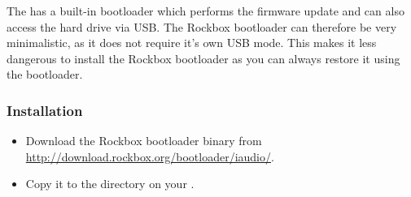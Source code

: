 The \archosplayername{} has a built-in bootloader which performs the
firmware update and can also access the hard drive via USB.  The
Rockbox bootloader can therefore be very minimalistic, as it does not require
 it's own USB mode.  This makes it less dangerous to install the Rockbox bootloader
 as you can always restore it using the \archosplayerman{} bootloader.


\subsubsection{Installation}
\begin{itemize}
\item Download the Rockbox bootloader binary from 
\url{http://download.rockbox.org/bootloader/iaudio/}.
\item Copy it to the  directory on your \dap{}.
\end{itemize}
